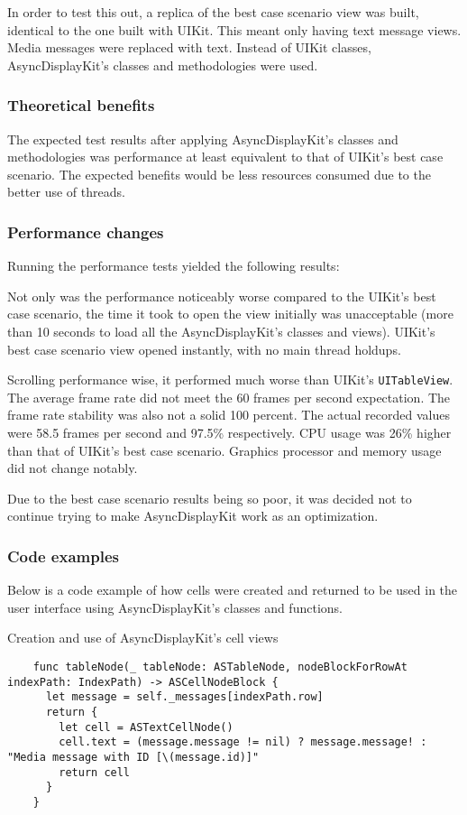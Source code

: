 \documentclass[a4paper,12pt]{article}
\begin{document}
In order to test this out, a replica of the best case scenario view was built, identical to the one built with UIKit. This meant only having text message views. Media messages were replaced with text. Instead of UIKit classes, AsyncDisplayKit's classes and methodologies were used.

\subsubsection*{Theoretical benefits}
The expected test results after applying AsyncDisplayKit's classes and methodologies was performance at least equivalent to that of UIKit's best case scenario. The expected benefits would be less resources consumed due to the better use of threads.

\subsubsection*{Performance changes}
Running the performance tests yielded the following results:

Not only was the performance noticeably worse compared to the UIKit's best case scenario, the time it took to open the view initially was unacceptable (more than 10 seconds to load all the AsyncDisplayKit's classes and views). UIKit's best case scenario view opened instantly, with no main thread holdups.

Scrolling performance wise, it performed much worse than UIKit's \texttt{UITableView}. The average frame rate did not meet the 60 frames per second expectation. The frame rate stability was also not a solid 100 percent. The actual recorded values were 58.5 frames per second and 97.5\% respectively. CPU usage was 26\% higher than that of UIKit's best case scenario. Graphics processor and memory usage did not change notably.

Due to the best case scenario results being so poor, it was decided not to continue trying to make AsyncDisplayKit work as an optimization.

\subsubsection*{Code examples}
Below is a code example of how cells were created and returned to be used in the user interface using AsyncDisplayKit's classes and functions.
\begin{listing}[H]
  \caption{Creation and use of AsyncDisplayKit's cell views}
  \begin{verbatim}
    func tableNode(_ tableNode: ASTableNode, nodeBlockForRowAt indexPath: IndexPath) -> ASCellNodeBlock {
      let message = self._messages[indexPath.row]
      return {
        let cell = ASTextCellNode()
        cell.text = (message.message != nil) ? message.message! : "Media message with ID [\(message.id)]"
        return cell
      }
    }
  \end{verbatim}
\end{listing}
\end{document}
